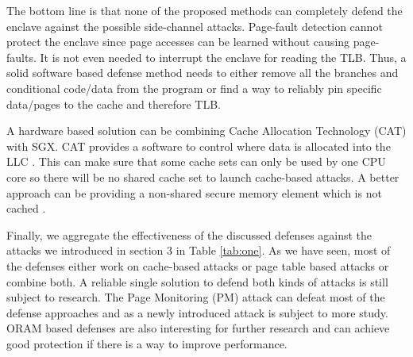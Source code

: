 The bottom line is that none of the proposed methods can completely defend the enclave against the possible side-channel attacks. Page-fault detection cannot protect the enclave since page accesses can be learned without causing page-faults. It is not even needed to interrupt the enclave for reading the TLB. Thus, a solid software based defense method needs to either remove all the branches and conditional code/data from the program or find a way to reliably pin specific data/pages to the cache and therefore TLB.

A hardware based solution can be combining Cache Allocation Technology (CAT) with SGX. CAT provides a software to control where data is allocated into the LLC \cite{cat}. This can make sure that some cache sets can only be used by one CPU core so there will be no shared cache set to launch cache-based attacks. A better approach can be providing a non-shared secure memory element which is not cached \cite{mge}.

Finally, we aggregate the effectiveness of the discussed defenses against the attacks we introduced in section 3 in Table \ref{tab:one}. As we have seen, most of the defenses either work on cache-based attacks or page table based attacks or combine both. A reliable single solution to defend both kinds of attacks is still subject to research. The Page Monitoring (PM) attack can defeat most of the defense approaches and as a newly introduced attack is subject to more study. ORAM based defenses are also interesting for further research and can achieve good protection if there is a way to improve performance.

